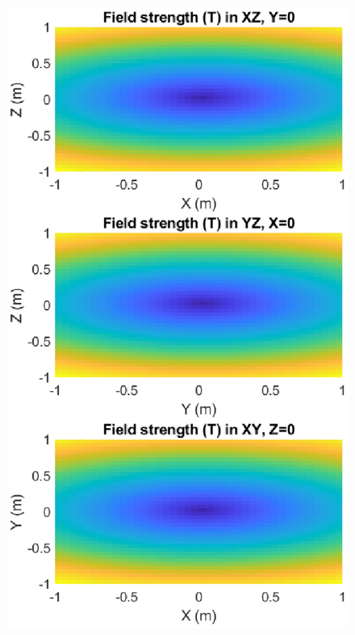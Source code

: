 \documentclass{book}
\theoremstyle{definition}
\begin{document}
\begin{figure}[!htb]
\begin{minipage}{.33\textwidth}
		\includegraphics[width=\linewidth]{sim-figs/quad-2.eps}
	\end{minipage}%
	\begin{minipage}{.33\textwidth}
		\centering

\end{minipage}
\end{figure}
\end{document}
